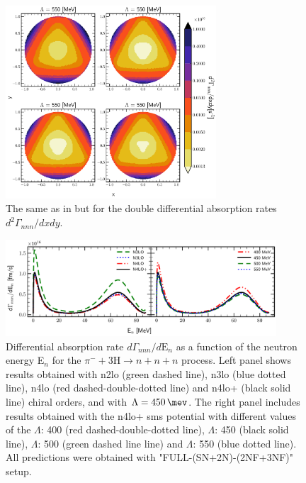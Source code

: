    \begin{figure}[h]
        \begin{center}
        \includegraphics[width=0.7\textwidth]{PlotData/PION/Dalitz_maps/figures/Dalitz_map_nnn_xy_orders.pdf}
        \end{center}
        \caption{The same as in  but for the double differential absorption rates
        $d^2 \Gamma_{nnn}/dxdy$.}
        \label{pion_nnn_xy_order}
    \end{figure}


    \begin{figure}[h]
        \begin{center}
        \includegraphics[width=0.9\textwidth]{PlotData/PION/Dalitz_maps/figures/3H_dGdEn.pdf}
        \end{center}
        \caption{Differential absorption rate $d\Gamma_{nnn} /d\text{E}_n$ 
        as a function of the neutron energy E$_n$ for the 
        $\pi^- + 3\text{H} \rightarrow n + n + n$ process.
        Left panel shows results obtained with \gls{n2lo} (green dashed line),
        \gls{n3lo} (blue dotted line), \gls{n4lo} (red dashed-double-dotted line)
        and \gls{n4lo+} (black solid line) chiral orders, and with $\Lambda = \SI{450}{\mev}$.
        The right panel includes results obtained with the \gls{n4lo+} \gls{sms} potential
        with different values of the $\Lambda$: \SI{400}{\mev} (red dashed-double-dotted line),
        $\Lambda$: \SI{450}{\mev} (black solid line),
        $\Lambda$: \SI{500}{\mev} (green dashed line line) and
        $\Lambda$: \SI{550}{\mev} (blue dotted line).
        All predictions were obtained with "FULL-(SN+2N)-(2NF+3NF)" setup.}
        \label{pion_dGdEn_3H}
    \end{figure}

